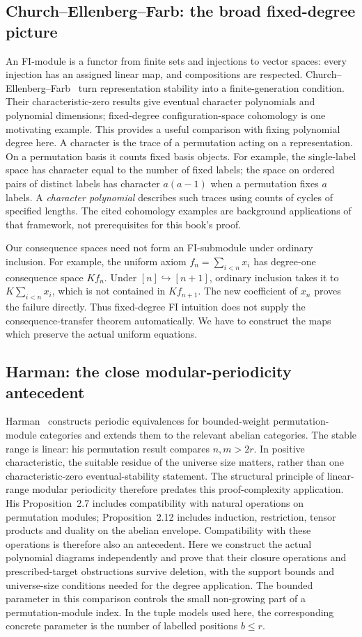 \subsection{Church--Ellenberg--Farb: the broad fixed-degree picture}
An FI-module is a functor from finite sets and injections to vector
spaces: every injection has an assigned linear map, and compositions
are respected. Church--Ellenberg--Farb~\cite{CEF} turn representation
stability into a finite-generation condition. Their characteristic-zero
results give eventual character polynomials and polynomial dimensions;
fixed-degree configuration-space cohomology is one motivating example.
This provides a useful comparison with fixing polynomial degree here.
A character is the trace of a permutation acting on a representation.
On a permutation basis it counts fixed basis objects. For example,
the single-label space has character equal to the number of fixed
labels; the space on ordered pairs of distinct labels has character
$a(a-1)$ when a
permutation fixes $a$ labels. A \emph{character polynomial} describes
such traces using counts of cycles of specified lengths.
The cited cohomology examples are background applications of that
framework, not prerequisites for this book's proof.

Our consequence spaces need not form an FI-submodule under ordinary
inclusion. For example, the uniform axiom $f_n=\sum_{i<n}x_i$ has
degree-one consequence space $Kf_n$. Under $[n]\hookrightarrow[n+1]$,
ordinary inclusion takes it to $K\sum_{i<n}x_i$, which is not contained
in $Kf_{n+1}$. The new coefficient of $x_n$ proves the failure directly.
Thus fixed-degree FI intuition does not supply the consequence-transfer
theorem automatically. We have to construct the maps which preserve
the actual uniform equations.

\subsection{Harman: the close modular-periodicity antecedent}
Harman~\cite[Theorem 2.5 and Corollary 2.11]{Harman} constructs
periodic equivalences for bounded-weight permutation-module categories
and extends them to the relevant abelian categories. The stable range
is linear: his permutation result compares $n,m>2r$. In positive
characteristic, the suitable residue of the universe size matters, rather than
one characteristic-zero eventual-stability statement.
The structural principle of linear-range modular periodicity therefore
predates this proof-complexity application.
His Proposition~2.7 includes compatibility with natural operations on
permutation modules; Proposition~2.12 includes induction, restriction,
tensor products and duality on the abelian envelope. Compatibility with
these operations is therefore also an antecedent. Here we construct
the actual polynomial diagrams independently and prove that their
closure operations and prescribed-target obstructions survive deletion,
with the support bounds and universe-size conditions needed for the degree application.
The bounded parameter in this comparison controls the small
non-growing part of a permutation-module index. In the tuple
models used here, the corresponding concrete parameter is the
number of labelled positions $b\le r$.

